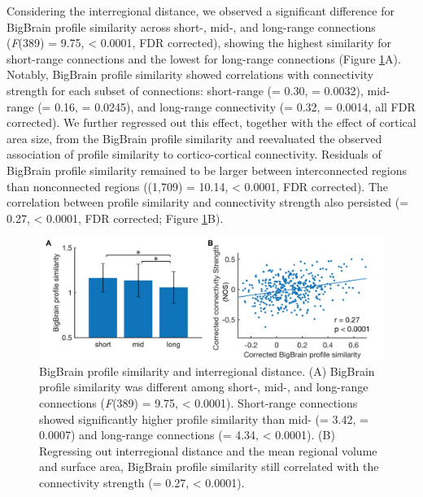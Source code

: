 \begin{refsection}
Considering the interregional distance, we observed a significant difference for BigBrain profile similarity across short-, mid-, and long-range connections (\textit{F}(389) = 9.75, \pval < 0.0001, FDR corrected), showing the highest similarity for short-range connections and the lowest for long-range connections (Figure \ref{bigbrainFig3}A). Notably, BigBrain profile similarity showed correlations with connectivity strength for each subset of connections: short-range (\rval = 0.30, \pval = 0.0032), mid-range (\rval = 0.16, \pval = 0.0245), and long-range connectivity (\rval = 0.32, \pval = 0.0014, all FDR corrected). We further regressed out this effect, together with the effect of cortical area size, from the BigBrain profile similarity and reevaluated the observed association of profile similarity to cortico-cortical connectivity. Residuals of BigBrain profile similarity remained to be larger between interconnected regions than nonconnected regions (\tvaldf(1,709) = 10.14, \pval < 0.0001, FDR corrected). The correlation between profile similarity and connectivity strength also persisted (\rval = 0.27, \pval < 0.0001, FDR corrected; Figure \ref{bigbrainFig3}B).

\begin{figure}[H]
    \centering
    \includegraphics[width=12cm]{images/thesis_bb_fig3.jpg}
    \caption{BigBrain profile similarity and interregional distance. (A) BigBrain profile similarity was different among short-, mid-, and long-range connections (\textit{F}(389) = 9.75, \pval < 0.0001). Short-range connections showed significantly higher profile similarity than mid- (\tval = 3.42, \pval = 0.0007) and long-range connections (\tval = 4.34, \pval < 0.0001). (B) Regressing out interregional distance and the mean regional volume and surface area, BigBrain profile similarity still correlated with the connectivity strength (\rval = 0.27, \pval < 0.0001).}
    \label{bigbrainFig3}
\end{figure}


\end{refsection}
